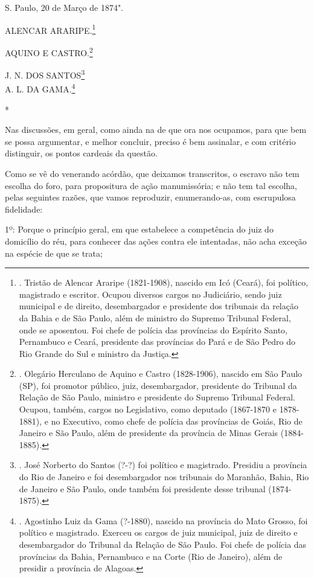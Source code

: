S. Paulo, 20 de Março de 1874".

ALENCAR ARARIPE.\footnote{. Tristão de Alencar Araripe (1821-1908),
  nascido em Icó (Ceará), foi político, magistrado e escritor. Ocupou
  diversos cargos no Judiciário, sendo juiz municipal e de direito,
  desembargador e presidente dos tribunais da relação da Bahia e de São
  Paulo, além de ministro do Supremo Tribunal Federal, onde se
  aposentou. Foi chefe de polícia das províncias do Espírito Santo,
  Pernambuco e Ceará, presidente das províncias do Pará e de São Pedro
  do Rio Grande do Sul e ministro da Justiça.}

AQUINO E CASTRO.\footnote{. Olegário Herculano de Aquino e Castro
  (1828-1906), nascido em São Paulo (SP), foi promotor público, juiz,
  desembargador, presidente do Tribunal da Relação de São Paulo,
  ministro e presidente do Supremo Tribunal Federal. Ocupou, também,
  cargos no Legislativo, como deputado (1867-1870 e 1878-1881), e no
  Executivo, como chefe de polícia das províncias de Goiás, Rio de
  Janeiro e São Paulo, além de presidente da província de Minas Gerais
  (1884-1885).}

J. N. DOS SANTOS\footnote{. José Norberto do Santos (?-?) foi político e
  magistrado. Presidiu a província do Rio de Janeiro e foi desembargador
  nos tribunais do Maranhão, Bahia, Rio de Janeiro e São Paulo, onde
  também foi presidente desse tribunal (1874-1875).}\\
A. L. DA GAMA.\footnote{. Agostinho Luiz da Gama (?-1880), nascido na
  província do Mato Grosso, foi político e magistrado. Exerceu os cargos
  de juiz municipal, juiz de direito e desembargador do Tribunal da
  Relação de São Paulo. Foi chefe de polícia das províncias da Bahia,
  Pernambuco e na Corte (Rio de Janeiro), além de presidir a província
  de Alagoas.}

*

Nas discussões, em geral, como ainda na de que ora nos ocupamos, para
que bem se possa argumentar, e melhor concluir, preciso é bem assinalar,
e com critério distinguir, os pontos cardeais da questão.

Como se vê do venerando acórdão, que deixamos transcritos, o escravo não
tem escolha do foro, para propositura de ação manumissória; e não tem
tal escolha, pelas seguintes razões, que vamos reproduzir,
enumerando-as, com escrupulosa fidelidade:

1º: Porque o princípio geral, em que estabelece a competência do juiz do
domicílio do réu, para conhecer das ações contra ele intentadas, não
acha exceção na espécie de que se trata;

